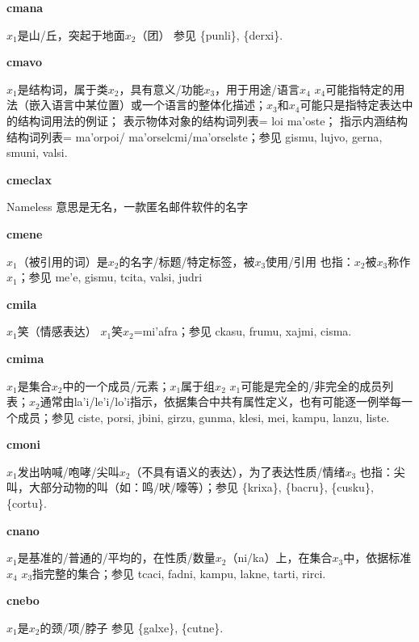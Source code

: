\documentclass[notitlepage,twocolumn,a4paper,10pt]{book}
\begin{document}
{\sffamily\bfseries cmana}\enspace {\ttfamily\bfseries[        ma'a]}  $x_1$是山\slash{}丘，突起于地面$x_2$（团） \textemdash{} 参见 \{punli\}, \{derxi\}.

{\sffamily\bfseries cmavo}\enspace {\ttfamily\bfseries[        ma'o]}  $x_1$是结构词，属于类$x_2$，具有意义\slash{}功能$x_3$，用于用途\slash{}语言$x_4$ \textemdash{} $x_4$可能指特定的用法（嵌入语言中某位置）或一个语言的整体化描述；$x_3$和$x_4$可能只是指特定表达中的结构词用法的例证； 表示物体对象的结构词列表= {loi} {ma'oste}； 指示内涵结构结构词列表= {ma'orpoi}\slash{} {ma'orselcmi}\slash{}{ma'orselste}；参见 {gismu}, {lujvo}, {gerna}, {smuni}, {valsi}.

{\sffamily\bfseries cmeclax} Nameless \textemdash{} 意思是无名，一款匿名邮件软件的名字

{\sffamily\bfseries cmene}\enspace {\ttfamily\bfseries[    cme me'e]}  $x_1$（被引用的词）是$x_2$的名字\slash{}标题\slash{}特定标签，被$x_3$使用\slash{}引用 \textemdash{} 也指：$x_2$被$x_3$称作$x_1$；参见 {me'e}, {gismu}, {tcita}, {valsi}, {judri}

{\sffamily\bfseries cmila}\enspace {\ttfamily\bfseries[        mi'a]}  $x_1$笑（情感表达） \textemdash{} $x_1$笑$x_2$={mi'afra}；参见 {ckasu}, {frumu}, {xajmi}, {cisma}.

{\sffamily\bfseries cmima}  $x_1$是集合$x_2$中的一个成员\slash{}元素；$x_1$属于组$x_2$ \textemdash{} $x_1$可能是完全的\slash{}非完全的成员列表；$x_2$通常由la'i\slash{}le'i\slash{}lo'i指示，依据集合中共有属性定义，也有可能逐一例举每一个成员；参见 {ciste}, {porsi}, {jbini}, {girzu}, {gunma}, {klesi}, {mei}, {kampu}, {lanzu}, {liste}.

{\sffamily\bfseries cmoni}\enspace {\ttfamily\bfseries[    cmo co'i]}  $x_1$发出呐喊\slash{}咆哮\slash{}尖叫$x_2$（不具有语义的表达），为了表达性质\slash{}情绪$x_3$ \textemdash{} 也指：尖叫，大部分动物的叫（如：鸣\slash{}吠\slash{}嚎等）；参见 \{krixa\}, \{bacru\}, \{cusku\}, \{cortu\}.

{\sffamily\bfseries cnano}\enspace {\ttfamily\bfseries[        na'o]}  $x_1$是基准的\slash{}普通的\slash{}平均的，在性质\slash{}数量$x_2$（ni\slash{}ka）上，在集合$x_3$中，依据标准$x_4$ \textemdash{} $x_3$指完整的集合；参见 {tcaci}, {fadni}, {kampu}, {lakne}, {tarti}, {rirci}.

{\sffamily\bfseries cnebo}\enspace {\ttfamily\bfseries[neb     ne'o]}  $x_1$是$x_2$的颈\slash{}项\slash{}脖子 \textemdash{} 参见 \{galxe\}, \{cutne\}.
\end{document}
